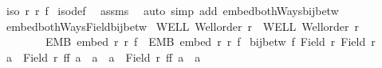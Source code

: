 \begin{isabellebody}
\ {\isachardoublequoteopen}iso\ r\ r{\isacharprime}{\kern0pt}\ f{\isachardoublequoteclose}\isanewline
%
\isadelimproof
%
\endisadelimproof
%
\isatagproof
{}\isamarkupfalse%
\ iso{\isacharunderscore}{\kern0pt}def\ \isamarkupfalse%
\ assms\ \isamarkupfalse%
\ {\isacharparenleft}{\kern0pt}auto\ simp\ add{\isacharcolon}{\kern0pt}\ embed{\isacharunderscore}{\kern0pt}bothWays{\isacharunderscore}{\kern0pt}bij{\isacharunderscore}{\kern0pt}betw{\isacharparenright}{\kern0pt}%
\endisatagproof
{\isafoldproof}%
%
\isadelimproof
%
\endisadelimproof
%
\isadelimdocument
%
\endisadelimdocument
%
\isatagdocument
%
\isamarkuptrue%
%
\endisatagdocument
{\isafolddocument}%
%
\isadelimdocument
%
\endisadelimdocument
{}\isamarkupfalse%
\ embed{\isacharunderscore}{\kern0pt}bothWays{\isacharunderscore}{\kern0pt}Field{\isacharunderscore}{\kern0pt}bij{\isacharunderscore}{\kern0pt}betw{\isacharcolon}{\kern0pt}\isanewline
{}\ WELL{\isacharcolon}{\kern0pt}\ {\isachardoublequoteopen}Well{\isacharunderscore}{\kern0pt}order\ r{\isachardoublequoteclose}\ \ WELL{\isacharprime}{\kern0pt}{\isacharcolon}{\kern0pt}\ {\isachardoublequoteopen}Well{\isacharunderscore}{\kern0pt}order\ r{\isacharprime}{\kern0pt}{\isachardoublequoteclose}\ \isanewline
\ \ \ \ \ \ \ \ EMB{\isacharcolon}{\kern0pt}\ {\isachardoublequoteopen}embed\ r\ r{\isacharprime}{\kern0pt}\ f{\isachardoublequoteclose}\ \ EMB{\isacharprime}{\kern0pt}{\isacharcolon}{\kern0pt}\ {\isachardoublequoteopen}embed\ r{\isacharprime}{\kern0pt}\ r\ f{\isacharprime}{\kern0pt}{\isachardoublequoteclose}\isanewline
{}\ {\isachardoublequoteopen}bij{\isacharunderscore}{\kern0pt}betw\ f\ {\isacharparenleft}{\kern0pt}Field\ r{\isacharparenright}{\kern0pt}\ {\isacharparenleft}{\kern0pt}Field\ r{\isacharprime}{\kern0pt}{\isacharparenright}{\kern0pt}{\isachardoublequoteclose}\isanewline
%
\isadelimproof
%
\endisadelimproof
%
\isatagproof
{}\isamarkupfalse%
{\isacharminus}{\kern0pt}\isanewline
\ \ \isamarkupfalse%
\ {\isachardoublequoteopen}{\isacharparenleft}{\kern0pt}{\isasymforall}a\ {\isasymin}\ Field\ r{\isachardot}{\kern0pt}\ f{\isacharprime}{\kern0pt}{\isacharparenleft}{\kern0pt}f\ a{\isacharparenright}{\kern0pt}\ {\isacharequal}{\kern0pt}\ a{\isacharparenright}{\kern0pt}\ {\isasymand}\ {\isacharparenleft}{\kern0pt}{\isasymforall}a{\isacharprime}{\kern0pt}\ {\isasymin}\ Field\ r{\isacharprime}{\kern0pt}{\isachardot}{\kern0pt}\ f{\isacharparenleft}{\kern0pt}f{\isacharprime}{\kern0pt}\ a{\isacharprime}{\kern0pt}{\isacharparenright}{\kern0pt}\ {\isacharequal}{\kern0pt}\ a{\isacharprime}{\kern0pt}{\isacharparenright}{\kern0pt}{\isachardoublequoteclose}\isanewline

\end{isabellebody}
